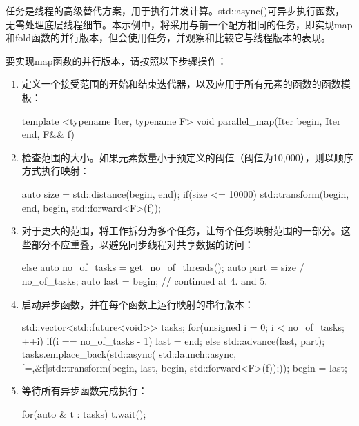 任务是线程的高级替代方案，用于执行并发计算。std::async()可异步执行函数，无需处理底层线程细节。本示例中，将采用与前一个配方相同的任务，即实现map和fold函数的并行版本，但会使用任务，并观察和比较它与线程版本的表现。


要实现map函数的并行版本，请按照以下步骤操作：

\begin{enumerate}
\item
定义一个接受范围的开始和结束迭代器，以及应用于所有元素的函数的函数模板：

\begin{cpp}
template <typename Iter, typename F>
void parallel_map(Iter begin, Iter end, F&& f)
{
}
\end{cpp}

\item
检查范围的大小。如果元素数量小于预定义的阈值（阈值为10,000），则以顺序方式执行映射：

\begin{cpp}
auto size = std::distance(begin, end);
if(size <= 10000)
    std::transform(begin, end, begin, std::forward<F>(f));
\end{cpp}

\item
对于更大的范围，将工作拆分为多个任务，让每个任务映射范围的一部分。这些部分不应重叠，以避免同步线程对共享数据的访问：

\begin{cpp}
else
{
    auto no_of_tasks = get_no_of_threads();
    auto part = size / no_of_tasks;
    auto last = begin;
    // continued at 4. and 5.
}
\end{cpp}

\item
启动异步函数，并在每个函数上运行映射的串行版本：

\begin{cpp}
std::vector<std::future<void>> tasks;
for(unsigned i = 0; i < no_of_tasks; ++i)
{
    if(i == no_of_tasks - 1) last = end;
    else std::advance(last, part);
    tasks.emplace_back(std::async(
    std::launch::async,
        [=,&f]{std::transform(begin, last, begin,
                              std::forward<F>(f));}));
    begin = last;
}
\end{cpp}

\item
等待所有异步函数完成执行：

\begin{cpp}
for(auto & t : tasks) t.wait();
\end{cpp}
\end{enumerate}


